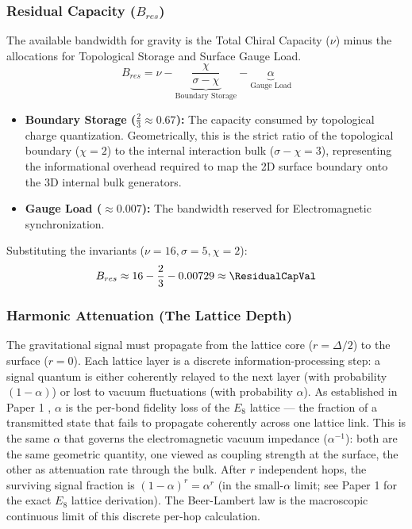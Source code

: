 \subsubsection{Residual Capacity (\texorpdfstring{$B_{res}$}{Bres})}
The available bandwidth for gravity is the Total Chiral Capacity ($\nu$) minus the allocations for Topological Storage and Surface Gauge Load.
\begin{equation}
B_{res} = \nu - \underbrace{\frac{\chi}{\sigma-\chi}}_{\text{Boundary Storage}} - \underbrace{\alpha}_{\text{Gauge Load}}
\end{equation}
\begin{itemize}
    \item \textbf{Boundary Storage ($\frac{2}{3} \approx 0.67$):} The capacity consumed by topological charge quantization. Geometrically, this is the strict ratio of the topological boundary ($\chi=2$) to the internal interaction bulk ($\sigma-\chi=3$), representing the informational overhead required to map the 2D surface boundary onto the 3D internal bulk generators.
    \item \textbf{Gauge Load ($\approx 0.007$):} The bandwidth reserved for Electromagnetic synchronization.
\end{itemize}
Substituting the invariants ($\nu=16, \sigma=5, \chi=2$):
\begin{equation}
B_{res} \approx 16 - \frac{2}{3} - 0.00729 \approx \mathbf{\ResidualCapVal}
\end{equation}

\subsubsection{Harmonic Attenuation (The Lattice Depth)}
The gravitational signal must propagate from the lattice core ($r = \Delta/2$) to the surface ($r = 0$). Each lattice layer is a discrete information-processing step: a signal quantum is either coherently relayed to the next layer (with probability $(1-\alpha)$) or lost to vacuum fluctuations (with probability $\alpha$). As established in Paper 1 \cite{meyer_informational_2026}, $\alpha$ is the per-bond fidelity loss of the $E_8$ lattice --- the fraction of a transmitted state that fails to propagate coherently across one lattice link. This is the same $\alpha$ that governs the electromagnetic vacuum impedance ($\alpha^{-1}$): both are the same geometric quantity, one viewed as coupling strength at the surface, the other as attenuation rate through the bulk. After $r$ independent hops, the surviving signal fraction is $(1-\alpha)^r = \alpha^r$ (in the small-$\alpha$ limit; see Paper 1 for the exact $E_8$ lattice derivation). The Beer-Lambert law is the macroscopic continuous limit of this discrete per-hop calculation.

